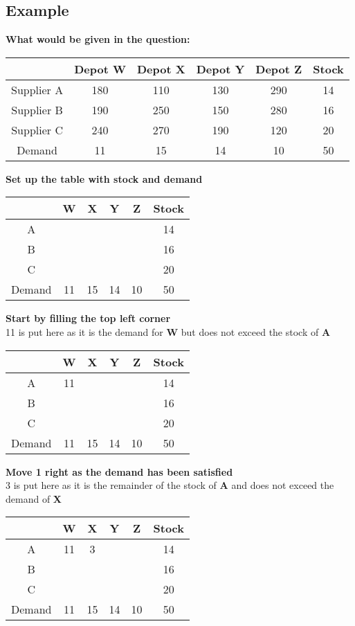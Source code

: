 \documentclass{article}[18pt]
\begin{document}
\subsection{Example}
\textbf{What would be given in the question:}
\begin{center}
\begin{tabular}{ |c|c|c|c|c|c| }
\hline
&Depot W&Depot X&Depot Y&Depot Z&Stock\\
\hline
Supplier A&180&110&130&290&14\\
\hline
Supplier B&190&250&150&280&16\\
\hline
Supplier C&240&270&190&120&20\\
\hline
Demand&11&15&14&10&50\\ 
\hline
\end{tabular}
\end{center}
\textbf{Set up the table with stock and demand}
\begin{center}
\begin{tabular}{ |c|c|c|c|c|c| }
\hline
&W&X&Y&Z&Stock\\
\hline
A&&&&&14\\
\hline
B&&&&&16\\
\hline
C&&&&&20\\
\hline
Demand&11&15&14&10&50\\ 
\hline
\end{tabular}
\end{center}
\newpage
\textbf{Start by filling the top left corner}\\
11 is put here as it is the demand for \textbf{W} but does not exceed the stock of \textbf{A}
\begin{center}
\begin{tabular}{ |c|c|c|c|c|c| }
\hline
&W&X&Y&Z&Stock\\
\hline
A&11&&&&14\\
\hline
B&&&&&16\\
\hline
C&&&&&20\\
\hline
Demand&11&15&14&10&50\\ 
\hline
\end{tabular}
\end{center}
\textbf{Move 1 right as the demand has been satisfied}\\
3 is put here as it is the remainder of the stock of \textbf{A} and does not exceed the demand of \textbf{X}
\begin{center}
\begin{tabular}{ |c|c|c|c|c|c| }
\hline
&W&X&Y&Z&Stock\\
\hline
A&11&3&&&14\\
\hline
B&&&&&16\\
\hline
C&&&&&20\\
\hline
Demand&11&15&14&10&50\\ 
\hline
\end{tabular}
\end{center}
\end{document}
